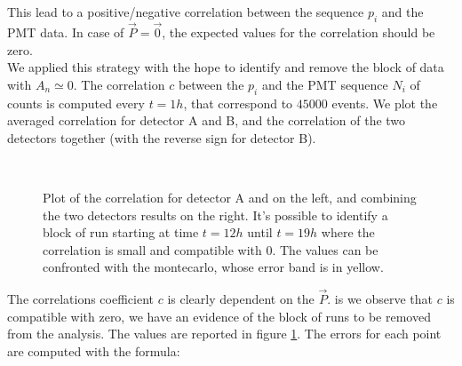 This lead to a positive/negative correlation between the sequence $p_{i}$ and the PMT data. In case of $\vec{P} = \vec{0}$, the expected values for the correlation should be zero. \\
We applied this strategy with the hope to identify and remove the block of data with $A_{n} \simeq 0$. The correlation $c$ between the $p_{i}$ and the PMT sequence $N_{i}$ of counts is computed every $t = 1 h$, that correspond to $45000$ events. We plot the averaged correlation for detector A and B, and the correlation of the two detectors together (with the reverse sign for detector B).

\begin{figure}[hbtp]
\centering
{} \\
\caption{Plot of the correlation for detector A and on the left, and combining the two detectors results on the right. It's possible to identify a block of run starting at time $t = 12 h$ until $t = 19 h$ where the correlation is small and compatible with $0$. The values can be confronted with the montecarlo, whose error band is in yellow.}
\label{fig:PolarityCheck}
\end{figure}

The correlations coefficient $c$ is clearly dependent on the $\vec{P}$. is we observe that $c$ is compatible with zero, we have an evidence of the block of runs to be removed from the analysis.
The values are reported in figure \ref{fig:PolarityCheck}. The errors for each point are computed with the formula:

